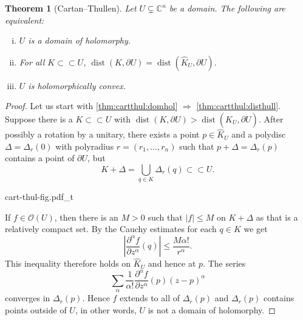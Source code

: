 \documentclass[12pt,openany]{book}
\newcommand{\sabs}[1]{\lvert {#1} \rvert}
\newcommand{\abs}[1]{\left\lvert {#1} \right\rvert}
\newcommand{\C}{{\mathbb{C}}}
\newcommand{\sO}{{\mathscr{O}}}
\theoremstyle{plain}
\newtheorem{thm}{Theorem}[section]
\theoremstyle{remark}
\theoremstyle{definition}
\newenvironment{myfig}{%
    \begin{center}
}{%
    \end{center}
}
\theoremstyle{exercise}
\theoremstyle{example}
\begin{document}
\begin{thm}[Cartan--Thullen]
\pagebreak[2]
\label{thm:cartthul}
Let $U \subsetneq \C^n$ be a domain.  The following are equivalent:
\begin{enumerate}[(i)]
\item \label{thm:cartthul:domhol}
$U$ is a domain of holomorphy.
\item \label{thm:cartthul:disthull}
For all $K \subset \subset U$,
$\operatorname{dist}(K,\partial U) = \operatorname{dist}(\widehat{K}_U,\partial U)$.
\item \label{thm:cartthul:holconv}
$U$ is holomorphically convex.
\end{enumerate}
\end{thm}

\begin{proof}
Let us start with \ref{thm:cartthul:domhol} $\Rightarrow$
\ref{thm:cartthul:disthull}.
Suppose there is a $K \subset
\subset U$ with $\operatorname{dist}(K,\partial U) > \operatorname{dist}(\widehat{K}_U,\partial U)$.
After possibly a rotation by a unitary,
there exists a point $p \in \widehat{K}_U$ and a polydisc
$\Delta = \Delta_r(0)$ with polyradius $r = (r_1,\ldots,r_n)$ such that
$p + \Delta = \Delta_r(p)$ contains a point of $\partial U$, but
\begin{equation*}
K + \Delta = \bigcup_{q \in K} \Delta_r(q) \subset \subset U.
\end{equation*}

\begin{myfig}
{cart-thul-fig.pdf_t}
\end{myfig}

If $f \in \sO(U)$, then there is an $M > 0$ such that $\sabs{f} \leq M$ on
$K + \Delta$ as that is a relatively compact set.  By the Cauchy estimates
for each $q \in K$ we get
\begin{equation*}
\abs{\frac{\partial^\alpha f}{\partial z^\alpha}(q)} \leq \frac{M
\alpha!}{r^\alpha} .
\end{equation*}
This inequality therefore holds on $\widehat{K}_U$ and hence at $p$.
The series
\begin{equation*}
\sum_{\alpha}
\frac{1}{\alpha !}\frac{\partial^\alpha f}{\partial z^\alpha}(p) {(z-p)}^\alpha 
\end{equation*}
converges in $\Delta_r(p)$.  Hence $f$ extends to all of $\Delta_r(p)$ and
$\Delta_r(p)$ contains points outside of $U$, in other words,
$U$ is not a domain of holomorphy.


\end{proof}
\end{document}
